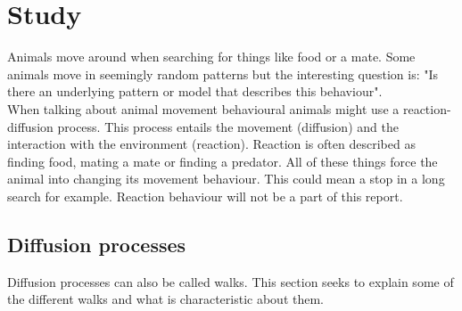 \chapter{Study}
Animals move around when searching for things like food or a mate. Some animals move in seemingly random patterns but the interesting question is: "Is there an underlying pattern or model that describes this behaviour".\\
When talking about animal movement behavioural animals might use a reaction-diffusion process. This process entails the movement (diffusion) and the interaction with the environment (reaction). Reaction is often described as finding food, mating a mate or finding a predator. All of these things force the animal into changing its movement behaviour. This could mean a stop in a long search for example. Reaction behaviour will not be a part of this report.

\section{Diffusion processes}
Diffusion processes can also be called walks. This section seeks to explain some of the different walks and what is characteristic about them.

